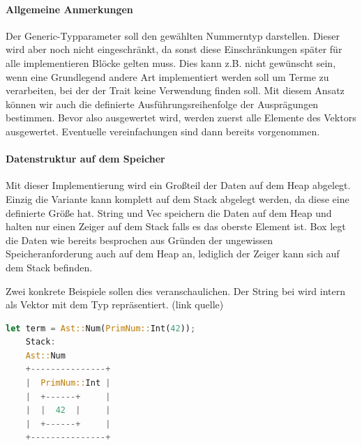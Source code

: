 \documentclass[11pt,a4paper, ngerman]{article}
\begin{document}
\paragraph{Allgemeine Anmerkungen} Der Generic-Typparameter  soll den gewählten Nummerntyp darstellen. Dieser wird aber noch nicht eingeschränkt, da sonst diese Einschränkungen später für alle implementieren Blöcke gelten muss. Dies kann z.B. nicht gewünscht sein, wenn eine Grundlegend andere Art implementiert werden soll um Terme zu verarbeiten, bei der der Trait  keine Verwendung finden soll. Mit diesem Ansatz können wir auch die definierte Ausführungsreihenfolge der Ausprägungen bestimmen. Bevor also  ausgewertet wird, werden zuerst alle Elemente des Vektors ausgewertet. Eventuelle vereinfachungen sind dann bereits vorgenommen.

\paragraph{Datenstruktur auf dem Speicher} Mit dieser Implementierung wird ein Großteil der Daten auf dem Heap abgelegt. Einzig die Variante  kann komplett auf dem Stack abgelegt werden, da diese eine definierte Größe hat. String und Vec speichern die Daten auf dem Heap und halten nur einen Zeiger auf dem Stack falls es das oberste Element ist. Box legt die Daten wie bereits besprochen aus Gründen der ungewissen Speicheranforderung auch auf dem Heap an, lediglich der Zeiger kann sich auf dem Stack befinden.

Zwei konkrete Beispiele sollen dies veranschaulichen. Der String bei  wird intern als Vektor mit dem Typ  repräsentiert. (link quelle)
\begin{lstlisting}[language=rust, caption={Term 1 Stack und Heap}]
    let term = Ast::Num(PrimNum::Int(42));
    Stack:
    Ast::Num
    +---------------+
    |  PrimNum::Int |
    |  +------+     |
    |  |  42  |     |
    |  +------+     |
    +---------------+
\end{lstlisting}
\end{document}
